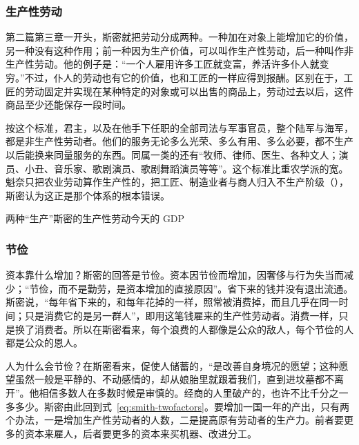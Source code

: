 \subsubsection{生产性劳动}
第二篇第三章一开头，斯密就把劳动分成两种。一种加在对象上能增加它的价值，另一种没有这种作用；前一种因为生产价值，可以叫作生产性劳动，后一种叫作非生产性劳动\cite{smith1776}。他的例子是：“一个人雇用许多工匠就变富，养活许多仆人就变穷。”不过，仆人的劳动也有它的价值，也和工匠的一样应得到报酬。区别在于，工匠的劳动固定并实现在某种特定的对象或可以出售的商品上，劳动过去以后，这件商品至少还能保存一段时间\cite{smith1776}。

按这个标准，君主，以及在他手下任职的全部司法与军事官员，整个陆军与海军，都是非生产性劳动者。他们的服务无论多么光荣、多么有用、多么必要，都不生产以后能换来同量服务的东西。同属一类的还有“牧师、律师、医生、各种文人；演员、小丑、音乐家、歌剧演员、歌剧舞蹈演员等等”\cite{smith1776}。这个标准比重农学派的宽。魁奈只把农业劳动算作生产性的，把工匠、制造业者与商人归入不生产阶级（），斯密认为这正是那个体系的根本错误。

\begin{compare}{两种“生产”}{斯密的生产性劳动}{今天的 GDP}
\end{compare}

\subsubsection{节俭}
资本靠什么增加？斯密的回答是节俭。资本因节俭而增加，因奢侈与行为失当而减少；“节俭，而不是勤劳，是资本增加的直接原因”\cite{smith1776}。省下来的钱并没有退出流通。斯密说，“每年省下来的，和每年花掉的一样，照常被消费掉，而且几乎在同一时间；只是消费它的是另一群人”，即用这笔钱雇来的生产性劳动者。消费一样，只是换了消费者\cite{smith1776}。所以在斯密看来，每个浪费的人都像是公众的敌人，每个节俭的人都是公众的恩人\cite{smith1776}。

人为什么会节俭？在斯密看来，促使人储蓄的，“是改善自身境况的愿望；这种愿望虽然一般是平静的、不动感情的，却从娘胎里就跟着我们，直到进坟墓都不离开”\cite{smith1776}。他相信多数人在多数时候是审慎的。经商的人里破产的，也许不比千分之一多多少\cite{smith1776}。斯密由此回到式~\eqref{eq:smith-twofactors}。要增加一国一年的产出，只有两个办法，一是增加生产性劳动者的人数，二是提高原有劳动者的生产力\cite{smith1776}。前者要更多的资本来雇人，后者要更多的资本来买机器、改进分工。

